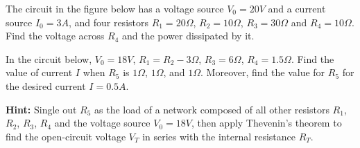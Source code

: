 

\item The circuit in the figure below has a voltage source $V_0=20V$ and a current 
source $I_0=3A$, and four resistors $R_1=20\Omega$, $R_2=10\Omega$, $R_3=30\Omega$ 
and $R_4=10\Omega$. Find the voltage across $R_4$ and the power dissipated by it.






\item In the circuit below, $V_0=18V$, $R_1=R_2-3\Omega$, $R_3=6\Omega$,
$R_4=1.5\Omega$. Find the value of current $I$ when $R_5$ is $1\Omega$,
$1\Omega$, and $1\Omega$. Moreover, find the value for $R_5$ for the
desired current $I=0.5A$.

{\bf Hint:} Single out $R_5$ as the load of a network composed of all other
resistors $R_1$, $R_2$, $R_3$, $R_4$ and the voltage source $V_0=18V$, then
apply Thevenin's theorem to find the open-circuit voltage $V_T$ in series
with the internal resistance $R_T$.




